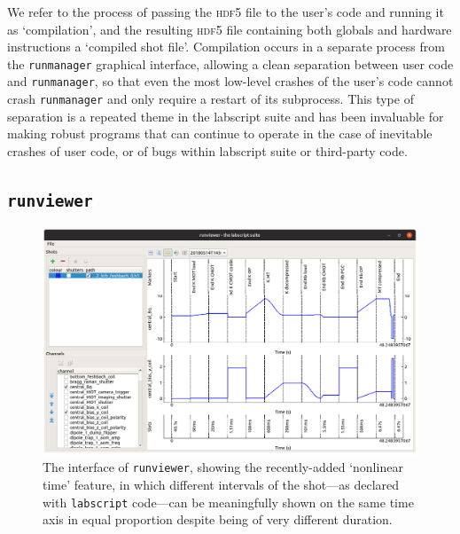 We refer to the process of passing the \textsc{hdf5} file to the user's code and running it as `compilation', and the resulting \textsc{hdf5} file containing both globals and hardware instructions a `compiled shot file'. Compilation occurs in a separate process from the \texttt{runmanager} graphical interface, allowing a clean separation between user code and \texttt{runmanager}, so that even the most low-level crashes of the user's code cannot crash \texttt{runmanager} and only require a restart of its subprocess. This type of separation is a repeated theme in the labscript suite and has been invaluable for making robust programs that can continue to operate in the case of inevitable crashes of user code, or of bugs within labscript suite or third-party code.

\subsection{\texttt{runviewer}}

\begin{figure}[t]
\begin{center}
\includegraphics[width=\textwidth]{figures/software/new_screenshots/runviewer.png}
\caption{The interface of \texttt{runviewer}, showing the recently-added `nonlinear time' feature, in which different intervals of the shot---as declared with \texttt{labscript} code---can be meaningfully shown on the same time axis in equal proportion despite being of very different duration.}\label{fig:runviewer}
\end{center}
\end{figure}

